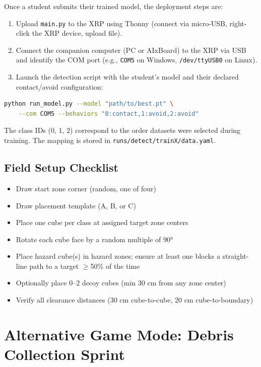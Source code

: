 \documentclass[11pt,a4paper]{article}
\begin{document}
Once a student submits their trained model, the deployment steps are:

\begin{enumerate}
    \item Upload \texttt{main.py} to the XRP using Thonny (connect via micro-USB, right-click the XRP device, upload file).
    \item Connect the companion computer (PC or AIxBoard) to the XRP via USB and identify the COM port (e.g., \texttt{COM5} on Windows, \texttt{/dev/ttyUSB0} on Linux).
    \item Launch the detection script with the student's model and their declared contact/avoid configuration:
\end{enumerate}

\begin{lstlisting}[language=bash]
python run_model.py --model "path/to/best.pt" \
    --com COM5 --behaviors "0:contact,1:avoid,2:avoid"
\end{lstlisting}

The class IDs (0, 1, 2) correspond to the order datasets were selected during training. The mapping is stored in \texttt{runs/detect/trainX/data.yaml}.

\subsection{Field Setup Checklist}

\begin{itemize}
    \item[$\square$] Draw start zone corner (random, one of four)
    \item[$\square$] Draw placement template (A, B, or C)
    \item[$\square$] Place one cube per class at assigned target zone centers
    \item[$\square$] Rotate each cube face by a random multiple of 90°
    \item[$\square$] Place hazard cube(s) in hazard zones; ensure at least one blocks a straight-line path to a target $\geq$50\% of the time
    \item[$\square$] Optionally place 0--2 decoy cubes (min 30 cm from any zone center)
    \item[$\square$] Verify all clearance distances (30 cm cube-to-cube, 20 cm cube-to-boundary)
\end{itemize}

\section{Alternative Game Mode: Debris Collection Sprint}
\end{document}
